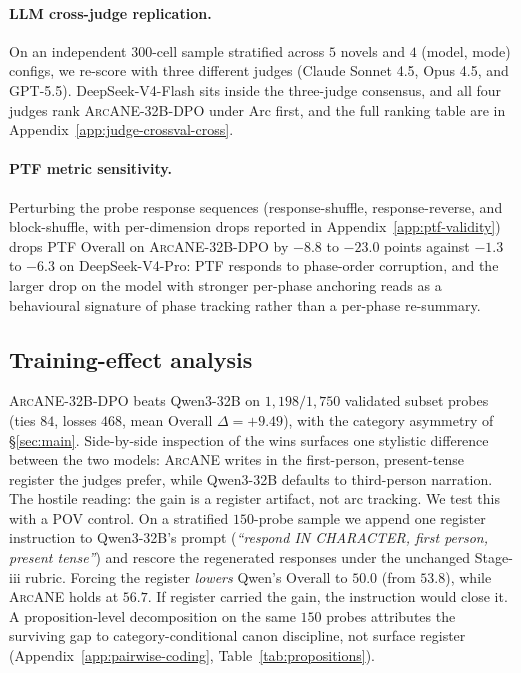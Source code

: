 \documentclass{llmxive}
\providecommand{\ours}{\textsc{ArcANE}}
\begin{document}
\paragraph{LLM cross-judge replication.} On an independent $300$-cell sample stratified across $5$ novels and $4$ (model, mode) configs, we re-score with three different judges (Claude Sonnet 4.5, Opus 4.5, and GPT-5.5). DeepSeek-V4-Flash sits inside the three-judge consensus, and all four judges rank \ours{}-32B-DPO under Arc first, and the full ranking table are in Appendix~\ref{app:judge-crossval-cross}.

\paragraph{PTF metric sensitivity.} Perturbing the probe response sequences (response-shuffle, response-reverse, and block-shuffle, with per-dimension drops reported in Appendix~\ref{app:ptf-validity}) drops PTF Overall on \ours{}-32B-DPO by $-8.8$ to $-23.0$ points against $-1.3$ to $-6.3$ on DeepSeek-V4-Pro: PTF responds to phase-order corruption, and the larger drop on the model with stronger per-phase anchoring reads as a behavioural signature of phase tracking rather than a per-phase re-summary.

\subsection{Training-effect analysis\label{sec:error-analysis}}
\ours{}-32B-DPO beats Qwen3-32B on $1{,}198/1{,}750$ validated subset probes (ties $84$, losses $468$, mean Overall $\Delta{=}{+}9.49$), with the category asymmetry of \S\ref{sec:main}. Side-by-side inspection of the wins surfaces one stylistic difference between the two models: \ours{} writes in the first-person, present-tense register the judges prefer, while Qwen3-32B defaults to third-person narration. The hostile reading: the gain is a register artifact, not arc tracking. We test this with a POV control. On a stratified $150$-probe sample we append one register instruction to Qwen3-32B's prompt (\emph{``respond IN CHARACTER, first person, present tense''}) and rescore the regenerated responses under the unchanged Stage-iii rubric. Forcing the register \emph{lowers} Qwen's Overall to $50.0$ (from $53.8$), while \ours{} holds at $56.7$. If register carried the gain, the instruction would close it. A proposition-level decomposition on the same $150$ probes attributes the surviving gap to category-conditional canon discipline, not surface register (Appendix~\ref{app:pairwise-coding}, Table~\ref{tab:propositions}).
\end{document}

